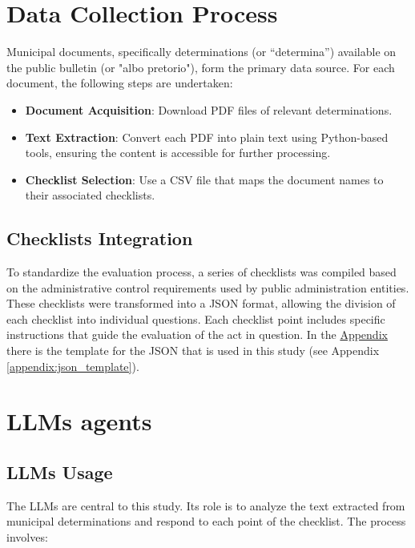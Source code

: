 \documentclass[../main.tex]{subfiles}
\begin{document}
\section{Data Collection Process}
Municipal documents, specifically determinations (or “determina”) available on the public bulletin (or "albo pretorio"), form the primary data source. For each document, the following steps are undertaken:

\begin{itemize}
    \item \textbf{Document Acquisition}: Download PDF files of relevant determinations.
    \item \textbf{Text Extraction}: Convert each PDF into plain text using Python-based tools, ensuring the content is accessible for further processing.
    \item \textbf{Checklist Selection}: Use a CSV file that maps the document names to their associated checklists.
\end{itemize}

\subsection{Checklists Integration}
To standardize the evaluation process, a series of checklists was compiled based on the administrative control requirements used by public administration entities. These checklists were transformed into a JSON format, allowing the division of each checklist into individual questions. Each checklist point includes specific instructions that guide the evaluation of the act in question. In the \hyperref[appendix:json_template]{Appendix} there is the template for the JSON that is used in this study (see Appendix \ref{appendix:json_template}).

\section{LLMs agents}
\subsection{LLMs Usage}
The LLMs are central to this study. Its role is to analyze the text extracted from municipal determinations and respond to each point of the checklist. The process involves:
\end{document}
